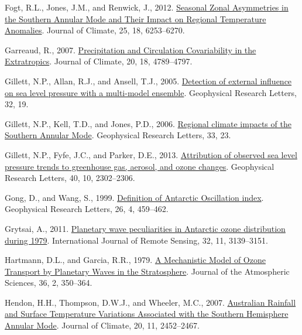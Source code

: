 \documentclass[12pt,oneside]{reedthesis}
\newlength{\cslhangindent}
\newenvironment{CSLReferences}[2] %
 {%
  \setlength{\parindent}{0pt}
  \ifodd #1 \everypar{\setlength{\hangindent}{\cslhangindent}}\ignorespaces\fi
  \ifnum #2 > 0
  \setlength{\parskip}{#2\baselineskip}
  \fi
 }%
 {}
\begin{document}
\begin{CSLReferences}{1}{0}
\leavevmode{}%
Fogt, R.L., Jones, J.M., and Renwick, J., 2012. \href{https://doi.org/10.1175/JCLI-D-11-00474.1}{Seasonal {Zonal Asymmetries} in the {Southern Annular Mode} and {Their Impact} on {Regional Temperature Anomalies}}. Journal of Climate, 25, 18, 6253--6270.

\leavevmode{}%
Garreaud, R., 2007. \href{https://doi.org/10.1175/JCLI4257.1}{Precipitation and {Circulation Covariability} in the {Extratropics}}. Journal of Climate, 20, 18, 4789--4797.

\leavevmode{}%
Gillett, N.P., Allan, R.J., and Ansell, T.J., 2005. \href{https://doi.org/10.1029/2005GL023640}{Detection of external influence on sea level pressure with a multi-model ensemble}. Geophysical Research Letters, 32, 19.

\leavevmode{}%
Gillett, N.P., Kell, T.D., and Jones, P.D., 2006. \href{https://doi.org/10.1029/2006GL027721}{Regional climate impacts of the {Southern Annular Mode}}. Geophysical Research Letters, 33, 23.

\leavevmode{}%
Gillett, N.P., Fyfe, J.C., and Parker, D.E., 2013. \href{https://doi.org/10.1002/grl.50500}{Attribution of observed sea level pressure trends to greenhouse gas, aerosol, and ozone changes}. Geophysical Research Letters, 40, 10, 2302--2306.

\leavevmode{}%
Gong, D., and Wang, S., 1999. \href{https://doi.org/10.1029/1999GL900003}{Definition of {Antarctic Oscillation} index}. Geophysical Research Letters, 26, 4, 459--462.

\leavevmode{}%
Grytsai, A., 2011. \href{https://doi.org/10.1080/01431161.2010.541518}{Planetary wave peculiarities in {Antarctic} ozone distribution during 1979}. International Journal of Remote Sensing, 32, 11, 3139--3151.

\leavevmode{}%
Hartmann, D.L., and Garcia, R.R., 1979. \href{https://doi.org/10.1175/1520-0469(1979)036\%3C0350:AMMOOT\%3E2.0.CO;2}{A {Mechanistic Model} of {Ozone Transport} by {Planetary Waves} in the {Stratosphere}}. Journal of the Atmospheric Sciences, 36, 2, 350--364.

\leavevmode{}%
Hendon, H.H., Thompson, D.W.J., and Wheeler, M.C., 2007. \href{https://doi.org/10.1175/JCLI4134.1}{Australian {Rainfall} and {Surface Temperature Variations Associated} with the {Southern Hemisphere Annular Mode}}. Journal of Climate, 20, 11, 2452--2467.


\end{CSLReferences}
\end{document}

